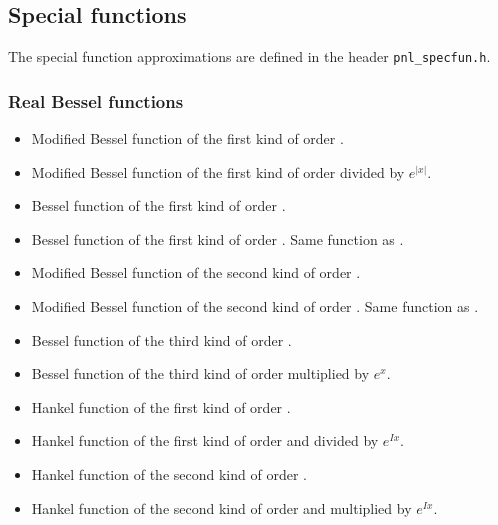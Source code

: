 



\subsection{Special functions}

The special function approximations are defined in the header \verb!pnl_specfun.h!.\\

\subsubsection{Real Bessel functions}

\begin{itemize}
\item {}
  \sshortdescribe   Modified Bessel function of the first
  kind of order .
\item {}
  \sshortdescribe   Modified Bessel function of the first
  kind of order  divided by $e^{|x|}$.
\item {}
  \sshortdescribe    Bessel function of the first
  kind of order .
\item {}
  \sshortdescribe    Bessel function of the first
  kind of order . Same function as .
\item {}
  \sshortdescribe   Modified Bessel function of the second
  kind of order .
\item {}
  \sshortdescribe   Modified Bessel function of the second
  kind of order . Same function as .
\item {}
  \sshortdescribe   Bessel function of the third
  kind of order .
\item {}
  \sshortdescribe   Bessel function of the third
  kind of order  multiplied by $e^{x}$.
\item {}
  \sshortdescribe   Hankel function of the first kind of
  order . 
\item {}
  \sshortdescribe  Hankel function of the first kind of order
    and divided by $e^{I x}$.
\item {}
  \sshortdescribe  Hankel function of the second kind of
  order . 
\item {}
  \sshortdescribe  Hankel function of the second kind of
  order   and multiplied by $e^{I x}$.
\end{itemize}

